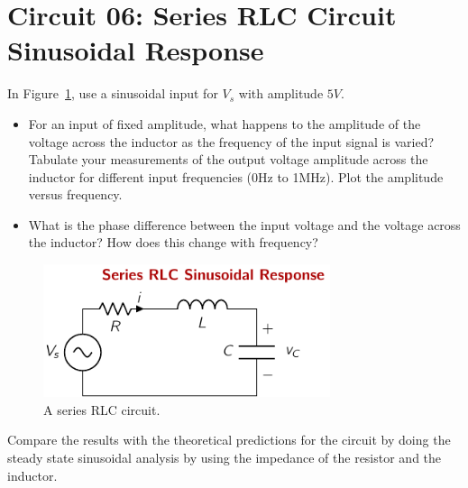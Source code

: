\section{Circuit 06: Series RLC Circuit Sinusoidal Response}
In Figure~\ref{fig:expt01-04}, use a sinusoidal input for $V_s$ with amplitude $5V$. 
\begin{itemize}
    \item For an input of fixed amplitude, what happens to the amplitude of the voltage across the inductor as the frequency of the input signal is varied? Tabulate your measurements of the output voltage amplitude across the inductor for different input frequencies (0Hz to 1MHz). Plot the amplitude versus frequency.
    \item What is the phase difference between the input voltage and the voltage across the inductor? How does this change with frequency?
\end{itemize}
\begin{figure}[htbp]
    \centering
    \includegraphics[width=0.75\textwidth]{figures/expt01/expt01-04.pdf}
    \caption{A series RLC circuit.}
    \label{fig:expt01-04}
\end{figure}
Compare the results with the theoretical predictions for the circuit by doing the steady state sinusoidal analysis by using the impedance of the resistor and the inductor.
